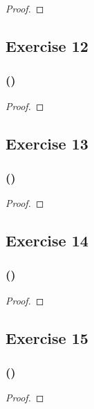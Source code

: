 \documentclass[14pt]{extarticle}
\begin{document}
\begin{proof}

\end{proof}

\subsection{Exercise 12}

\subsubsection{()}

\begin{proof}

\end{proof}

\subsection{Exercise 13}

\subsubsection{()}

\begin{proof}

\end{proof}

\subsection{Exercise 14}

\subsubsection{()}

\begin{proof}

\end{proof}

\subsection{Exercise 15}

\subsubsection{()}

\begin{proof}

\end{proof}
\end{document}
